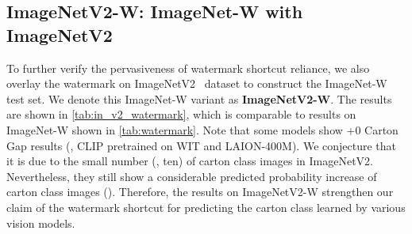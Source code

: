 \documentclass[10pt,twocolumn,letterpaper]{article}
\begin{document}
\subsection{ImageNetV2-W: ImageNet-W with ImageNetV2}
\label{appx:subsec:in_w_on_in_v2}

To further verify the pervasiveness of watermark shortcut reliance, we also overlay the watermark on ImageNetV2~\cite{recht2019Proc.36thInt.Conf.Mach.Learn.ImageNet} dataset to construct the ImageNet-W test set. We denote this ImageNet-W variant as \textbf{ImageNetV2-W}. The results are shown in \cref{tab:in_v2_watermark}, which is comparable to results on ImageNet-W shown in \cref{tab:watermark}. Note that some models show +0 Carton Gap results (\eg, CLIP pretrained on WIT and LAION-400M). We conjecture that it is due to the small number (\ie, ten) of carton class images in ImageNetV2. Nevertheless, they still show a considerable predicted probability increase of carton class images (). Therefore, the results on ImageNetV2-W strengthen our claim of the watermark shortcut for predicting the carton class learned by various vision models.
\end{document}
